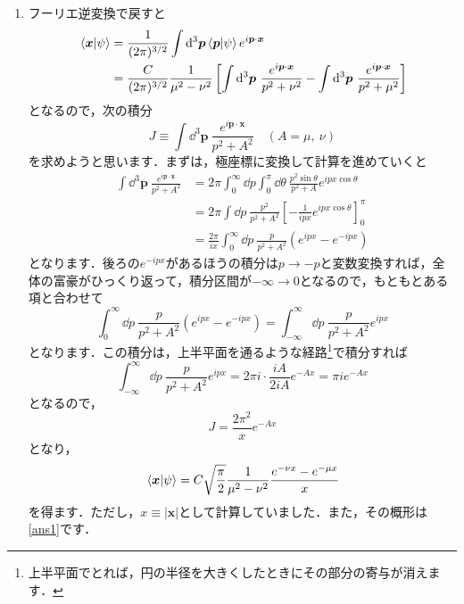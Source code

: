 \documentclass[a4paper,pdflatex,ja=standard]{bxjsarticle}
\begin{document}
\begin{enumerate}
  \item 

  フーリエ逆変換で戻すと
  \begin{align}
    \ev*{\bm{x}|\psi}
    &=
    \frac{1}{(2\pi)^{3/2}}
    \int\dd^3 \bm{p}
    \ev*{\bm{p}|\psi}e^{i\bm{p}\cdot\bm{x}}
    \nonumber
    \\
    &=
    \frac{C}{(2\pi)^{3/2}}\frac{1}{\mu^2-\nu^2}
    \left[  
      \int\dd^3 \bm{p}\ 
      \frac{e^{i\bm{p}\cdot\bm{x}}}{p^2+\nu^2}
      -
      \int\dd^3 \bm{p}\ 
      \frac{e^{i\bm{p}\cdot\bm{x}}}{p^2+\mu^2}
    \right]
  \end{align}
  となるので，次の積分
  \begin{equation}
    J
    \equiv
    \int\dd^3 \bm{p}\ 
    \frac{e^{i\bm{p}\cdot\bm{x}}}{p^2+A^2}    
    \quad
    (A=\mu,\ \nu)
  \end{equation}
  を求めようと思います．まずは，極座標に変換して計算を進めていくと
  \begin{align}
    \int\dd^3 \bm{p}\ 
    \frac{e^{i\bm{p}\cdot\bm{x}}}{p^2+A^2}    
    &=
    2\pi\int_{0}^{\infty}\dd p\int_{0}^{\pi}\dd \theta\ 
    \frac{p^2\sin\theta}{p^2+A}e^{ipx\cos\theta}
    \nonumber
    \\
    &=
    2\pi\int\dd p\ \frac{p^2}{p^2+A^2}
    \left[  
      -\frac{1}{ipx}e^{ipx\cos\theta}
    \right]_{0}^{\pi}
    \nonumber
    \\
    &=
    \frac{2\pi}{ix}
    \int_{0}^{\infty}\dd p\ \frac{p}{p^2+A^2}(e^{ipx}-e^{-ipx})
  \end{align}
  となります．後ろの$e^{-ipx}$があるほうの積分は$p\rightarrow -p$と変数変換すれば，全体の富豪がひっくり返って，積分区間が$-\infty\rightarrow 0$となるので，もともとある項と合わせて
  \begin{equation}    
    \int_{0}^{\infty}\dd p\ \frac{p}{p^2+A^2}(e^{ipx}-e^{-ipx})
    =
    \int_{-\infty}^{\infty}\dd p\ \frac{p}{p^2+A^2}e^{ipx}
  \end{equation}
  となります．この積分は，上半平面を通るような経路\footnote{
    上半平面でとれば，円の半径を大きくしたときにその部分の寄与が消えます．
  }で積分すれば
  \begin{equation}
    \int_{-\infty}^{\infty}\dd p\ \frac{p}{p^2+A^2}e^{ipx}
    =
    2\pi i
    \cdot\frac{iA}{2iA}e^{-Ax}
    =
    \pi ie^{-Ax}
  \end{equation}
  となるので，
  \begin{equation}
    J
    =
    \frac{2\pi^2}{x}e^{-Ax}
  \end{equation}
  となり，
  \begin{equation}
    \ev*{\bm{x}|\psi}
    =
    C\sqrt{\frac{\pi}{2}}\frac{1}{\mu^2-\nu^2}
    \frac{e^{-\nu x}-e^{-\mu x}}{x}
  \end{equation}
  を得ます．ただし，$x\equiv|\bm{x}|$として計算していました．また，その概形は\ref{ans1}です．


\end{enumerate}
\end{document}
